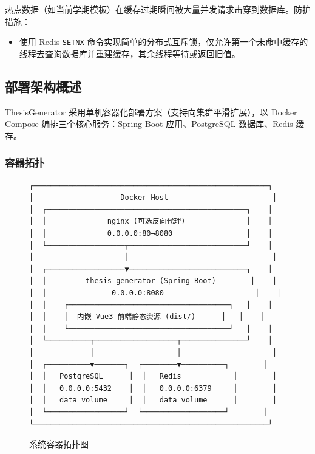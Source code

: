 热点数据（如当前学期模板）在缓存过期瞬间被大量并发请求击穿到数据库。防护措施：
\begin{itemize}
    \item 使用 Redis \texttt{SETNX} 命令实现简单的分布式互斥锁，仅允许第一个未命中缓存的线程去查询数据库并重建缓存，其余线程等待或返回旧值。
\end{itemize}

\subsection{部署架构概述}

ThesisGenerator 采用单机容器化部署方案（支持向集群平滑扩展），以 Docker Compose 编排三个核心服务：Spring Boot 应用、PostgreSQL 数据库、Redis 缓存。

\subsubsection{容器拓扑}

\begin{figure}[htbp]
\centering
\begin{verbatim}
┌──────────────────────────────────────────────────────┐
│                    Docker Host                        │
│  ┌──────────────────────────────────────────────┐    │
│  │              nginx (可选反向代理)              │    │
│  │              0.0.0.0:80→8080                 │    │
│  └──────────────────┬───────────────────────────┘    │
│                     │                                 │
│  ┌──────────────────▼───────────────────────────┐    │
│  │         thesis-generator (Spring Boot)        │    │
│  │               0.0.0.0:8080                     │    │
│  │    ┌─────────────────────────────────────┐   │    │
│  │    │  内嵌 Vue3 前端静态资源 (dist/)      │   │    │
│  │    └─────────────────────────────────────┘   │    │
│  └──────────┬───────────────────┬───────────────┘    │
│             │                   │                     │
│  ┌──────────▼───────┐  ┌────────▼──────────┐        │
│  │   PostgreSQL      │  │   Redis            │        │
│  │   0.0.0.0:5432    │  │   0.0.0.0:6379     │        │
│  │   data volume     │  │   data volume      │        │
│  └──────────────────┘  └───────────────────┘        │
└──────────────────────────────────────────────────────┘
\end{verbatim}
\caption{系统容器拓扑图}
\label{fig:deploy-topology}
\end{figure}

